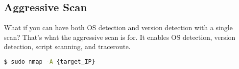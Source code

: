 \documentclass[11pt]{article}  %
\newenvironment{commandbox}[1][]{
    \begin{tcolorbox}[
        colback=kalibackground,   
        colframe=commandcolor,    
        fonttitle=\bfseries\color{white},  
        title=#1,               
        breakable=true           
    ]
}{
    \end{tcolorbox}
}
\begin{document}
\thispagestyle{empty}

\setcounter{section}{1}
\setcounter{subsection}{3}

\subsection{\huge \color{subsectioncolor}Aggressive Scan}

What if you can have both OS detection and version detection with a single scan? That's what the aggressive scan is for. It enables OS detection, version detection, script scanning, and traceroute.

\begin{commandbox}[Aggressive Scan]
\begin{lstlisting}[language=bash, style=bash, basicstyle=\normalsize\ttfamily\color{warningcolor}]
$ sudo nmap -A {target_IP}
\end{lstlisting}


\end{commandbox}
\end{document}
